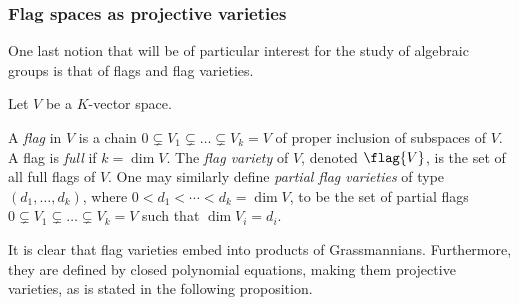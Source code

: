 \subsubsection{Flag spaces as projective varieties}

One last notion that will be of particular interest for the study of algebraic groups is that of flags and flag varieties.

\begin{defn}
    Let $V$ be a $K$-vector space. 
    
    A \emph{flag} in $V$ is a chain $0 \subsetneq V_1 \subsetneq \ldots \subsetneq V_k = V$ of proper inclusion of subspaces of $V$. A flag is \emph{full} if $k = \dim{V}$. The \emph{flag variety} of $V$, denoted $\flag{V}$, is the set of all full flags of $V$. One may similarly define \emph{partial flag varieties} of type $(d_1, \ldots, d_k)$, where $0 < d_1 < \cdots < d_k = \dim V$, to be the set of partial flags $0 \subsetneq V_1 \subsetneq \ldots \subsetneq V_k = V$ such that $\dim{V_i} = d_i$.
\end{defn}

It is clear that flag varieties embed into products of Grassmannians. Furthermore, they are defined by closed polynomial equations, making them projective varieties, as is stated in the following proposition.

